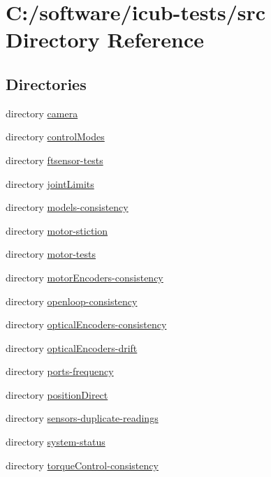 \section{C\+:/software/icub-\/tests/src Directory Reference}
\label{dir_68267d1309a1af8e8297ef4c3efbcdba}
\subsection*{Directories}
\begin{DoxyCompactItemize}
\item 
directory \hyperlink{dir_34519bff5ae72130fe71a8620cbf1fc0}{camera}
\item 
directory \hyperlink{dir_67a6d6fd93427d49c4a56e9e89568513}{control\+Modes}
\item 
directory \hyperlink{dir_58c9f48d72e7737305eca65c820f5d4c}{ftsensor-\/tests}
\item 
directory \hyperlink{dir_52bb83cdfa78eea1d57abbea3c8e3d28}{joint\+Limits}
\item 
directory \hyperlink{dir_6355ee7e8e7fccbf90712e6e68524328}{models-\/consistency}
\item 
directory \hyperlink{dir_3b1318bac6af3327e49b6f2c90562c86}{motor-\/stiction}
\item 
directory \hyperlink{dir_5eba7e4699fbf6bf477756242c12a311}{motor-\/tests}
\item 
directory \hyperlink{dir_ff120bfd69174aceba0b7c2c1b4a03e3}{motor\+Encoders-\/consistency}
\item 
directory \hyperlink{dir_f9de59b413a1f1ae04ea264c82cc2719}{openloop-\/consistency}
\item 
directory \hyperlink{dir_0aefa438636c1636d118e887341170fd}{optical\+Encoders-\/consistency}
\item 
directory \hyperlink{dir_7f61241abd7fbdf9954805296c6d0bed}{optical\+Encoders-\/drift}
\item 
directory \hyperlink{dir_d6cc1804077fb7a0bee471bebe09c948}{ports-\/frequency}
\item 
directory \hyperlink{dir_de7c96bd180ef87bf5425ed419472c36}{position\+Direct}
\item 
directory \hyperlink{dir_6fc1adc4fe0a69d5cc9f87dc6006118e}{sensors-\/duplicate-\/readings}
\item 
directory \hyperlink{dir_22920df90588b6b2fe85332a8ebd338b}{system-\/status}
\item 
directory \hyperlink{dir_ea8250e1e424defa140420a75e35c564}{torque\+Control-\/consistency}
\end{DoxyCompactItemize}
